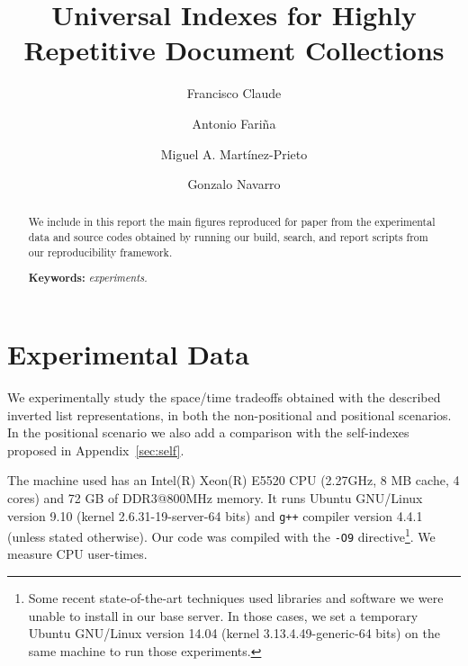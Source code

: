 \documentclass[review]{elsarticle}
\begin{document}
 
\begin{frontmatter}	
	\title{Universal Indexes for Highly Repetitive Document Collections}
	\tnotetext[t1]{}

	\author[udp]{Francisco Claude}

	\author[udc]{Antonio Fari\~na}

	\author[uva]{Miguel A. Mart\'inez-Prieto}

	\author[uchile]{Gonzalo Navarro}


	\address[udp]{Escuela de Inform\'atica y Telecomunicaciones,
Universidad Diego Portales, Chile.\\}
	\address[udc]{Database Laboratory, University of A Coru\~na, Spain.\\}
	\address[uva]{DataWeb Research, Department of Computer Science, 
	  University of Valladolid, Spain.}		
	\address[uchile]{Department of Computer Science, University of Chile, Chile.}

	\begin{abstract}
We include in this report the main figures reproduced for paper \cite{CFMNis16.3} from the experimental data and source codes obtained by
running our build, search, and report scripts from our reproducibility framework.
\bigskip
\noindent

{\bf Keywords:} {\em experiments.}
	\end{abstract}

\end{frontmatter}



\section{Experimental Data}

We experimentally study the space/time tradeoffs obtained with the described 
inverted list representations, in both the non-positional and positional 
scenarios. In the positional scenario we also add a comparison with the 
self-indexes proposed in Appendix~\ref{sec:self}.

The machine used  has an Intel(R) Xeon(R) E5520 CPU (2.27GHz, 
8 MB cache, 4 cores) and 72 GB of DDR3@800MHz memory. 
It runs Ubuntu GNU/Linux version 9.10 (kernel 2.6.31-19-server-64 bits) and 
\verb|g++| compiler version 4.4.1 (unless stated otherwise). Our code was compiled with the \verb|-O9| directive\footnote{Some recent
state-of-the-art techniques \cite{OV14} used libraries and software we were unable to install in our base server. In those cases, we set a temporary Ubuntu GNU/Linux version 14.04 (kernel 3.13.4.49-generic-64 bits) on the same machine to run those experiments.}. We measure CPU user-times.
\end{document}
